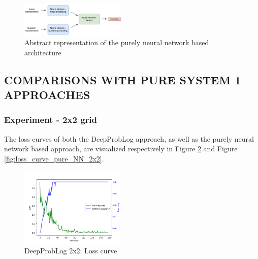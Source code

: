 \documentclass[english]{sobraep}
\begin{document}
\begin{figure}[H]
    \begin{center}
    \includegraphics[width=0.45\textwidth]{pure_nn_architecture.png} 
    \captionsetup{justification=centering}
    \caption{Abstract representation of the purely neural network based architecture \cite{model_architecture}}
    \label{fig:pure_nn_network}
    \end{center}
\end{figure}

\subsection{COMPARISONS WITH PURE SYSTEM 1 APPROACHES}
\label{subsec:experiments_NN_vs_deepproblog}
\subsubsection{Experiment - 2x2 grid}
The loss curves of both the DeepProbLog approach, as well as the purely neural network based approach, are visualized respectively in Figure \ref{fig:loss_curve_deepproblog_2x2} and Figure \ref{fig:loss_curve_pure_NN_2x2}.

\begin{figure}[htp]
    \begin{center}
    \includegraphics[width=0.45\textwidth]{loss_curve_deepproblog_2x2.png} 
    \captionsetup{justification=centering}
    \caption{DeepProbLog 2x2: Loss curve}
    \label{fig:loss_curve_deepproblog_2x2}
    \end{center}
\end{figure}
\end{document}
